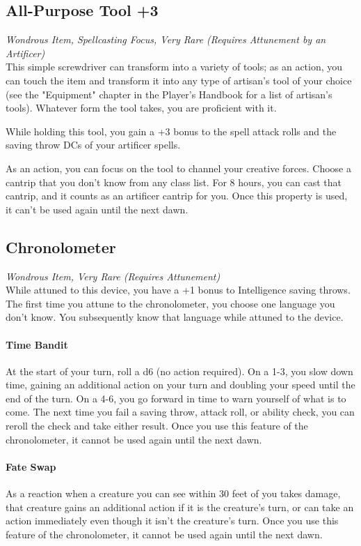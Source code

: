 \documentclass[letterpaper,openany,oneside,twocolumn]{book}
\begin{document}
\subsection*{All-Purpose Tool +3}
\textit{Wondrous Item, Spellcasting Focus, Very Rare (Requires Attunement by an Artificer)}\\
This simple screwdriver can transform into a variety of tools; as an action, you can touch the item and transform it into any type of artisan's tool of your choice (see the "Equipment" chapter in the Player's Handbook for a list of artisan's tools). Whatever form the tool takes, you are proficient with it.

While holding this tool, you gain a +3 bonus to the spell attack rolls and the saving throw DCs of your artificer spells.

As an action, you can focus on the tool to channel your creative forces. Choose a cantrip that you don't know from any class list. For 8 hours, you can cast that cantrip, and it counts as an artificer cantrip for you. Once this property is used, it can't be used again until the next dawn.

\subsection*{Chronolometer}
\textit{Wondrous Item, Very Rare (Requires Attunement)}\\
While attuned to this device, you have a +1 bonus to Intelligence saving throws. The first time you attune to the chronolometer, you choose one language you don't know. You subsequently know that language while attuned to the device.

\paragraph*{Time Bandit} At the start of your turn, roll a d6 (no action required). On a 1-3, you slow down time, gaining an additional action on your turn and doubling your speed until the end of the turn. On a 4-6, you go forward in time to warn yourself of what is to come. The next time you fail a saving throw, attack roll, or ability check, you can reroll the check and take either result. Once you use this feature of the chronolometer, it cannot be used again until the next dawn.

\paragraph*{Fate Swap} As a reaction when a creature you can see within 30 feet of you takes damage, that creature gains an additional action if it is the creature's turn, or can take an action immediately even though it isn't the creature's turn. Once you use this feature of the chronolometer, it cannot be used again until the next dawn.
\end{document}
